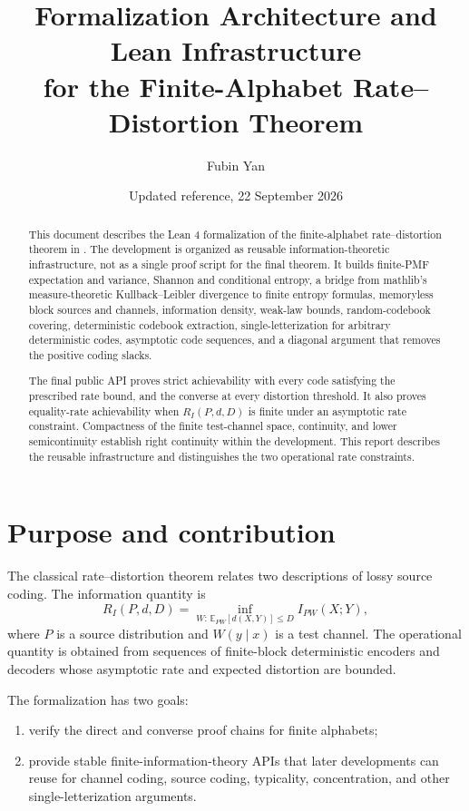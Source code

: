 \documentclass[11pt]{article}
\title{Formalization Architecture and Lean Infrastructure\\
for the Finite-Alphabet Rate--Distortion Theorem}
\author{Fubin Yan}
\date{Updated reference, 22 September 2026}
\newcommand{\E}{\mathbb{E}}
\newcommand{\RD}{R_I}
\newcommand{\MI}{I}
\begin{document}
\raggedbottom
\maketitle

\begin{abstract}
This document describes the Lean 4 formalization of the finite-alphabet
rate--distortion theorem in .
The development is organized as reusable information-theoretic infrastructure,
not as a single proof script for the final theorem.  It builds finite-PMF
expectation and variance, Shannon and conditional entropy, a bridge from
mathlib's measure-theoretic Kullback--Leibler divergence to finite entropy
formulas, memoryless block sources and channels, information density, weak-law
bounds, random-codebook covering, deterministic codebook extraction,
single-letterization for arbitrary deterministic codes, asymptotic code
sequences, and a diagonal argument that removes the positive coding slacks.

The final public API proves strict achievability with every code satisfying
the prescribed rate bound, and the converse at every distortion threshold.
It also proves equality-rate achievability when $\RD(P,d,D)$ is finite under
an asymptotic rate constraint. Compactness of the finite test-channel space,
continuity, and lower semicontinuity establish right continuity within the
development. This report describes the reusable infrastructure and distinguishes
the two operational rate constraints.
\end{abstract}

\tableofcontents

\section{Purpose and contribution}

The classical rate--distortion theorem relates two descriptions of lossy source
coding.  The information quantity is
\[
  \RD(P,d,D)
  = \inf_{W:\,\E_{P W}[d(X,Y)]\le D} \MI_{P W}(X;Y),
\]
where $P$ is a source distribution and $W(y\mid x)$ is a test channel.  The
operational quantity is obtained from sequences of finite-block deterministic
encoders and decoders whose asymptotic rate and expected distortion are bounded.

The formalization has two goals:
\begin{enumerate}
  \item verify the direct and converse proof chains for finite alphabets;
  \item provide stable finite-information-theory APIs that later developments
        can reuse for channel coding, source coding, typicality, concentration,
        and other single-letterization arguments.
\end{enumerate}
\end{document}

